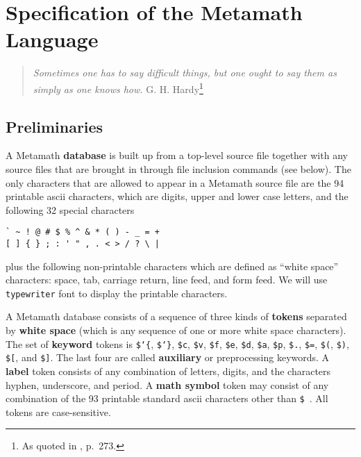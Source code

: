 \section{Specification of the Metamath Language}\label{spec}

\begin{quote}
  {\em Sometimes one has to say difficult things, but one ought to say
them as simply as one knows how.}
    \flushright\sc  G. H. Hardy\footnote{As quoted in
    \cite{deMillo}, p.~273.}\\
\end{quote}

\subsection{Preliminaries}\label{spec1}

A Metamath {\bf database} is built up from a top-level source
file together with any source files that are brought in through file inclusion
commands (see below).  The only characters that are allowed to appear in a
Metamath source file are the 94 printable {\sc
ascii} characters, which are digits, upper and lower
case letters, and the following 32 special characters
\label{spec1chars}

\begin{verbatim}
` ~ ! @ # $ % ^ & * ( ) - _ = +
[ ] { } ; : ' " , . < > / ? \ |
\end{verbatim}
plus the following non-printable characters which are
defined as ``white space'' characters: space, tab,
carriage return, line feed, and form feed.\label{whitespace}
We will use \texttt{typewriter}
font to display the printable characters.

A Metamath database consists of a sequence of three kinds of {\bf
tokens} separated by {\bf white space}
(which is any sequence of one or more white space characters).  The set
of {\bf keyword} tokens is \texttt{\$\char`\{},
\texttt{\$\char`\}}, \texttt{\$c}, \texttt{\$v}, \texttt{\$f},
\texttt{\$e}, \texttt{\$d}, \texttt{\$a}, \texttt{\$p}, \texttt{\$.},
\texttt{\$=}, \texttt{\$(}, \texttt{\$)}, \texttt{\$[}, and
\texttt{\$]}.  The last four are called {\bf auxiliary} or preprocessing keywords.  A {\bf label} token
consists of any combination of letters, digits, and the characters
hyphen, underscore, and period.  A {\bf math symbol}
token may consist of any combination of the 93 printable standard {\sc
ascii} characters other than \texttt{\$}~. All tokens are
case-sensitive.

